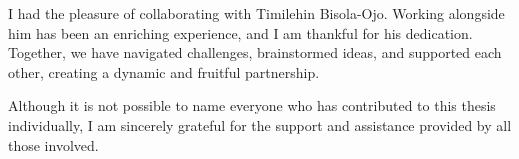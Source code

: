 \documentclass[
	parspace, %
	noindent, %
	nohyp, %
	final, %
]{elteikthesis}[2023/04/10]
\begin{document}
I had the pleasure of collaborating with Timilehin Bisola-Ojo. Working alongside him has been an enriching experience, and I am thankful for his dedication. Together, we have navigated challenges, brainstormed ideas, and supported each other, creating a dynamic and fruitful partnership.

Although it is not possible to name everyone who has contributed to this thesis individually, I am sincerely grateful for the support and assistance provided by all those involved.

\tableofcontents
\cleardoublepage


\cleardoublepage


\cleardoublepage


\cleardoublepage


\cleardoublepage


{}
\printbibliography[title=\biblabel]
\cleardoublepage

{}
\listoffigures
\cleardoublepage

{}
\listoftables
\cleardoublepage


{}
\lstlistoflistings
\cleardoublepage

\appendix

\end{document}
